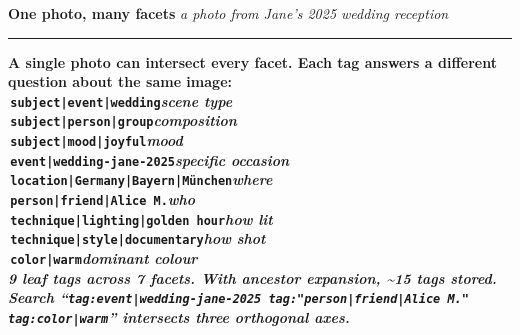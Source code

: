 \documentclass[a3paper,landscape,10pt]{article}
\newcommand{\cmd}[1]{\texttt{\small #1}}
\newcommand{\secthead}[2]{%
  \textcolor{maki-salmon}{\bfseries\normalsize #1}\hspace{1em}%
  \textcolor{maki-stone}{\footnotesize\itshape #2}\\[2pt]%
  {\color{maki-salmon!40}\hrule height 0.4pt}\vspace{6pt}%
}
\begin{document}
\begin{minipage}[t]{0.335\textwidth}
  \secthead{One photo, many facets}{a photo from Jane's 2025 wedding reception}

  \newcommand{\fdot}[1]{\raisebox{0.15ex}{\color{#1}\rule{0.6em}{0.6em}}\,}

  \begin{tcolorbox}[colback=maki-cream, colframe=maki-nori, boxrule=0.6pt, arc=3pt,
      left=8pt, right=8pt, top=6pt, bottom=6pt]
    \raggedright
    \small\bfseries\color{maki-nori}
    A single photo can intersect every facet. Each tag answers a
    different question about the same image:\\[4pt]

    \scriptsize\normalfont
    \setlength{\parskip}{1.5pt}
    \fdot{fc-subject}\cmd{subject|event|wedding}\hfill{\color{maki-stone}\itshape scene type}\\
    \fdot{fc-subject}\cmd{subject|person|group}\hfill{\color{maki-stone}\itshape composition}\\
    \fdot{fc-subject}\cmd{subject|mood|joyful}\hfill{\color{maki-stone}\itshape mood}\\
    \fdot{fc-event}\cmd{event|wedding-jane-2025}\hfill{\color{maki-stone}\itshape specific occasion}\\
    \fdot{fc-location}\cmd{location|Germany|Bayern|München}\hfill{\color{maki-stone}\itshape where}\\
    \fdot{fc-person}\cmd{person|friend|Alice M.}\hfill{\color{maki-stone}\itshape who}\\
    \fdot{fc-technique}\cmd{technique|lighting|golden hour}\hfill{\color{maki-stone}\itshape how lit}\\
    \fdot{fc-technique}\cmd{technique|style|documentary}\hfill{\color{maki-stone}\itshape how shot}\\
    \fdot{fc-color}\cmd{color|warm}\hfill{\color{maki-stone}\itshape dominant colour}\\[4pt]

    {\color{maki-stone}\itshape
    9 leaf tags across 7 facets. With ancestor expansion,
    \textasciitilde 15 tags stored. Search ``\cmd{tag:event|wedding-jane-2025
    tag:"person|friend|Alice M." tag:color|warm}'' intersects three orthogonal axes.}
  \end{tcolorbox}

  \vspace{6pt}


\end{minipage}
\end{document}
